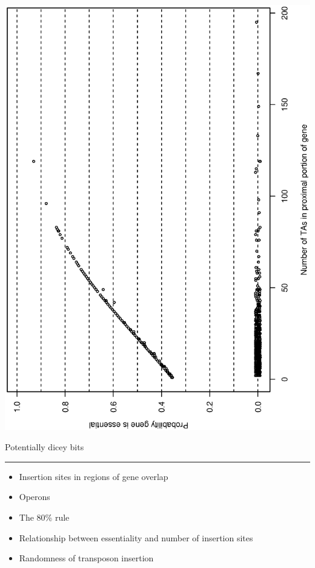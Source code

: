 \documentclass[12pt]{article}
\newcommand{\headsize}{\fontsize{35}{35} \selectfont}
\newcommand{\textsize}{\fontsize{30}{35} \selectfont}
\newcommand{\headcolor}{\color [cmyk]{0.72,0.67,0.33,0}}
\newcommand{\linecolor}{\color [named]{Thistle}}
\begin{document}
\vspace{-15mm}
\centerline{\includegraphics[angle=270]{Figs/prob_essential.ps}}



\newpage

\headsize \headcolor
\centerline{Potentially dicey bits}
\linecolor \noindent \rule[3mm]{10in}{2mm}

\vspace{5mm}
\textsize \normalcolor

\hfill
\begin{minipage}[t]{9.5in} \begin{itemize}
\setlength{\rightskip}{0pt plus 1fil} %
\setlength{\itemsep}{15pt}

\item Insertion sites in regions of gene overlap

\item Operons

\item The 80\% rule

\item Relationship between essentiality and number of insertion sites

\item Randomness of transposon insertion
\end{itemize} \end{minipage}
\end{document}
